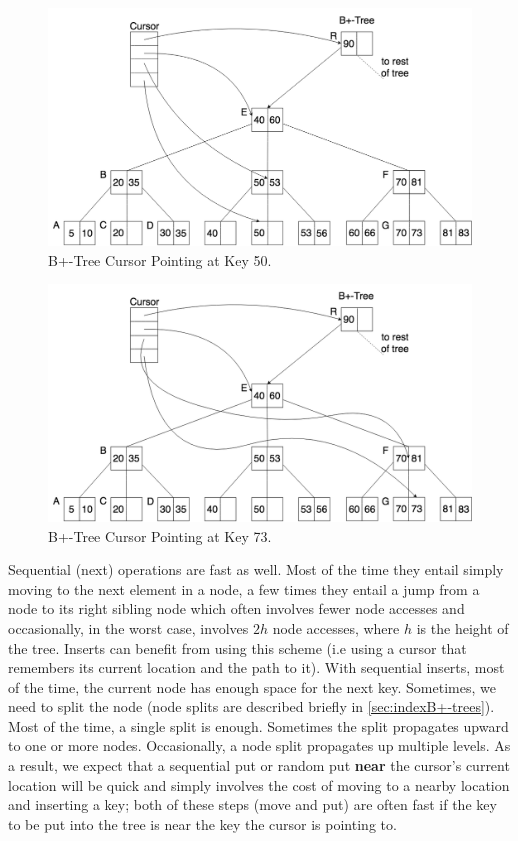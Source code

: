 \begin{figure}[h]
    \centering
    \includegraphics[scale=0.30]{figures/CursorAt50.png}
    \caption{B+-Tree Cursor Pointing at Key 50.}
    \label{fig:exB+Cursor50}
\end{figure}


\begin{figure}[h]
    \centering
    \includegraphics[scale=0.30]{figures/CursorAt73.png}
    \caption{B+-Tree Cursor Pointing at Key 73.}
    \label{fig:exB+Cursor73}
\end{figure}


Sequential (next) operations are fast as well. Most of the time they entail simply moving to the next element in a node, a few times they entail a jump from a node to its right sibling node which often involves fewer node accesses and occasionally, in the worst case, involves $2h$ node accesses, where $h$ is the height of the tree. Inserts can benefit from using this scheme (i.e using a cursor that remembers its current location and the path to it). With sequential inserts, most of the time, the current node has enough space for the next key. Sometimes, we need to split the node (node splits are described briefly in \ref{sec:indexB+-trees}). Most of the time, a single split is enough. Sometimes the split propagates upward to one or more nodes. Occasionally, a node split propagates up multiple levels. As a result, we expect that a sequential put or random put \textbf{near} the cursor's current location will be quick and simply involves the cost of moving to a nearby location and inserting a key; both of these steps (move and put) are often fast if the key to be put into the tree is near the key the cursor is pointing to.

